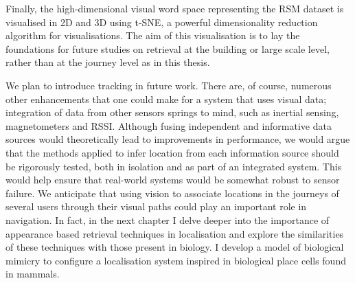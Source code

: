 Finally, the high-dimensional visual word space representing the RSM dataset is visualised in 2D and 3D using t-SNE, a powerful dimensionality reduction algorithm for visualisations. The aim of this visualisation is to lay the foundations for future studies on retrieval at the building or large scale level, rather than at the journey level as in this thesis.

We plan to introduce tracking in future work. There are, of course, numerous other enhancements that one could make for a system that uses visual data; integration of data from other sensors springs to mind, such as inertial sensing, magnetometers and RSSI.  Although fusing independent and informative data sources would theoretically lead to improvements in performance, we would argue that the methods applied to infer location from each information source should be rigorously tested, both in isolation and as part of an integrated system.  This would help ensure that real-world systems would be somewhat robust to sensor failure. We anticipate that using vision to associate locations in the journeys of several users through their visual paths could play an important role in navigation. In fact, in the next chapter I delve deeper into the importance of appearance based retrieval techniques in localisation and explore the similarities of these techniques with those present in biology. I develop a model of biological mimicry to configure a localisation system inspired in biological place cells found in mammals.


\label{sec:conclusion}


